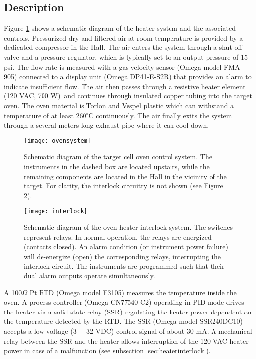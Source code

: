 \subsection{Description}
Figure \ref{fig:oven} shows a schematic diagram of the heater system
and the associated controls. Pressurized dry and filtered air at room 
temperature is provided by a dedicated compressor in the Hall. The air
enters the system through a shut-off valve and a pressure regulator,
which is typically set to an output pressure of 15 psi. The flow rate
is measured with a gas velocity sensor (Omega model FMA-905) connected
to a display unit (Omega DP41-E-S2R) that provides an alarm
to indicate insufficient flow. The air then passes through a
resistive heater element (120 VAC, 700 W)\ and continues through
insulated copper tubing into the target oven. The
oven material is Torlon and Vespel plastic which can withstand a
temperature of at least 260$^\circ$C continuously.
The air finally exits the system through a several meters long
exhaust pipe where it can cool down.

\begin{figure}
\begin{center}
\centerline{\texttt{[image: ovensystem]}}
\end{center}
\caption{Schematic diagram of the target cell oven control system. The
instruments in the dashed box are located upstairs, while the remaining
components are located in the Hall in the vicinity of the target. 
For clarity, the interlock circuitry
is not shown (see Figure \protect\ref{fig:interlock}).}
\label{fig:oven}
\end{figure}

\begin{figure}
\begin{center}
\centerline{\texttt{[image: interlock]}}
\end{center}
\caption{Schematic diagram of the oven heater interlock system.
The switches represent relays. 
In normal operation, the relays are energized (contacts closed). 
An alarm condition
(or instrument power failure) will de-energize (open)
 the corresponding relays,  interrupting the interlock circuit.
The instruments are programmed such that their dual alarm outputs
operate simultaneously.}
\label{fig:interlock}
\end{figure}


A 100$\Omega$ Pt RTD (Omega model F3105) measures the temperature
inside the oven. A process
controller (Omega CN77540-C2) operating in PID mode drives the
heater via a solid-state relay (SSR) regulating the heater power
dependent on the temperature detected by the RTD.
The SSR (Omega model SSR240DC10) accepts a low-voltage (3 $-$ 32 VDC)
control signal of about 30 mA. A mechanical relay between the SSR and
the heater allows interruption of the 120 VAC heater power in case of a 
malfunction (see subsection \ref{sec:heaterinterlock}).

